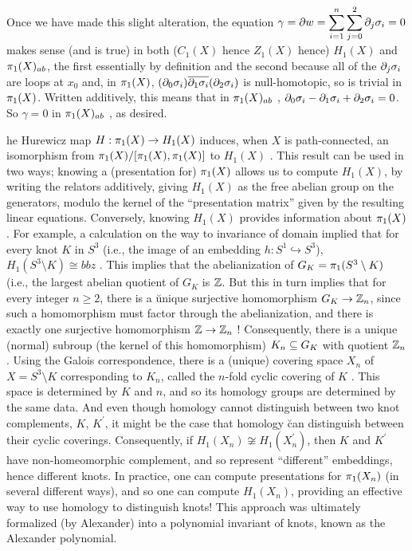 \ssk

Once we have made this slight alteration, the equation
$\displaystyle \gamma = \partial w = \sum_{i=1}^n \sum_{j=0}^2 \partial_j \sigma_i = 0$
makes sense (and is true) in both ($C_1(X)$ hence $Z_1(X)$ hence) $H_1(X)$ and
$\pi_1(X)_{ab}$, the first essentially by definition and the second because 
all of the $\partial_j \sigma_i$ are loops at $x_0$ and, in 
$\pi_1(X)$, $(\partial_0\sigma_i)\overline{\partial_1\sigma_i}(\partial_2\sigma_i)$ is null-homotopic,
so is trivial in $\pi_1(X)$. Written additively, this means that in
$\pi_1(X)_{ab}$ , $\partial_0\sigma_i - \partial_1\sigma_i + \partial_2\sigma_i = 0$. 
So $\gamma = 0$ in $\pi_1(X)_{ab}$ , as desired.


\bsk

he Hurewicz map $H:\pi_1(X)\rightarrow H_1(X)$ induces, when $X$ is path-connected,
an isomorphism from $\pi_1(X)/[\pi_1(X),\pi_1(X)]$ to $H_1(X)$ . 
This result can be used in two ways; knowing a (presentation for) $\pi_1(X)$
allows us to compute $H_1(X)$, by writing the relators additively, giving
$H_1(X)$ as the free abelian group on the generators, modulo the kernel 
of the ``presentation matrix'' given by the resulting linear equations. Conversely,
knowing $H_1(X)$ provides information about $\pi_1(X)$. For example,
a calculation on the way to invariance of domain implied that for every
knot $K$ in $S^3$ (i.e., the image of an embedding $h:S^1\hookrightarrow S^3$),
$H_1(S^3\setminus K) \cong bbz$ . This implies that the abelianization of 
$G_K = \pi_1(S^3\setminus K)$ (i.e., the largest abelian quotient of $G_K$  is ${\Bbb Z}$.
But this in turn implies that for every integer $n\geq 2$, there is a \u{unique}
surjective homomorphism $G_K\rightarrow {\Bbb Z}_n$, since such a homomorphism must factor 
through the abelianization, and there is exactly one surjective homomorphism
${\Bbb Z} \rightarrow {\Bbb Z}_n$ ! Consequently, there is a unique (normal) subroup (the kernel
of this homomorphism) $K_n\subseteq G_K$ with quotient ${\Bbb Z}_n$ . Using the Galois
correspondence, there is a (unique) covering space $X_n$ of $X=S^3\setminus K$
corresponding to $K_n$, called the $n$-fold cyclic covering of $K$ . This space is determined
by $K$ and $n$, and so its homology groups are determined by the same data.
And even though homology cannot distinguish between two knot complements,
$K$, $K^\prime$, it might be the case that homology \u{can} distinguish between 
their cyclic coverings. Consequently, 
if $H_1(X_n)\not\cong H_1(X_n^\prime)$, then $K$ and $K^\prime$ have non-homeomorphic
complement, and so represent ``different'' embeddings, hence different knots.
In practice, one can compute presentations for $\pi_1(X_n)$ (in several different ways),
and so one can compute $H_1(X_n)$, providing an effective way to use homology
to distinguish knots! This approach was ultimately formalized (by Alexander) into a polynomial
invariant of knots, known as the Alexander polynomial.

